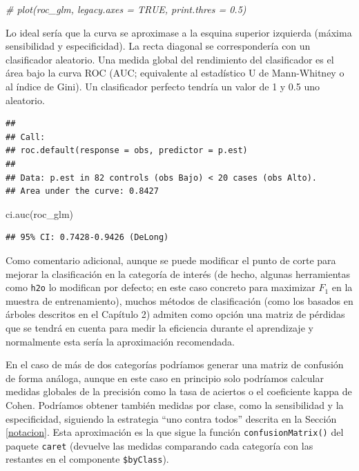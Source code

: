 \documentclass[
]{book}
\newenvironment{Shaded}{\begin{snugshade}}{\end{snugshade}}
\newcommand{\CommentTok}[1]{\textcolor[rgb]{0.56,0.35,0.01}{\textit{#1}}}
\newcommand{\FunctionTok}[1]{\textcolor[rgb]{0.00,0.00,0.00}{#1}}
\newcommand{\NormalTok}[1]{#1}
\theoremstyle{break}
\theoremstyle{definition}
\theoremstyle{definition}
\theoremstyle{definition}
\theoremstyle{definition}
\theoremstyle{remark}
\begin{document}
\begin{Shaded}
\begin{Highlighting}[]
\CommentTok{\# plot(roc\_glm, legacy.axes = TRUE, print.thres = 0.5)}
\end{Highlighting}
\end{Shaded}

Lo ideal sería que la curva se aproximase a la esquina superior izquierda (máxima sensibilidad y especificidad).
La recta diagonal se correspondería con un clasificador aleatorio.
Una medida global del rendimiento del clasificador es el área bajo la curva ROC (AUC; equivalente al estadístico U de Mann-Whitney o al índice de Gini).
Un clasificador perfecto tendría un valor de 1 y 0.5 uno aleatorio.

\begin{Shaded}
\end{Shaded}

\begin{verbatim}
## 
## Call:
## roc.default(response = obs, predictor = p.est)
## 
## Data: p.est in 82 controls (obs Bajo) < 20 cases (obs Alto).
## Area under the curve: 0.8427
\end{verbatim}

\begin{Shaded}
\begin{Highlighting}[]
\FunctionTok{ci.auc}\NormalTok{(roc\_glm)}
\end{Highlighting}
\end{Shaded}

\begin{verbatim}
## 95% CI: 0.7428-0.9426 (DeLong)
\end{verbatim}

Como comentario adicional, aunque se puede modificar el punto de corte para mejorar la clasificación en la categoría de interés (de hecho, algunas herramientas como \texttt{h2o} lo modifican por defecto; en este caso concreto para maximizar \(F_1\) en la muestra de entrenamiento), muchos métodos de clasificación (como los basados en árboles descritos en el Capítulo 2) admiten como opción una matriz de pérdidas que se tendrá en cuenta para medir la eficiencia durante el aprendizaje y normalmente esta sería la aproximación recomendada.

En el caso de más de dos categorías podríamos generar una matriz de confusión de forma análoga,
aunque en este caso en principio solo podríamos calcular medidas globales de la precisión como la tasa de aciertos o el coeficiente kappa de Cohen.
Podríamos obtener también medidas por clase, como la sensibilidad y la especificidad, siguiendo la estrategia ``uno contra todos'' descrita en la Sección \ref{notacion}.
Esta aproximación es la que sigue la función \texttt{confusionMatrix()} del paquete \texttt{caret} (devuelve las medidas comparando cada categoría con las restantes en el componente \texttt{\$byClass}).
\end{document}
